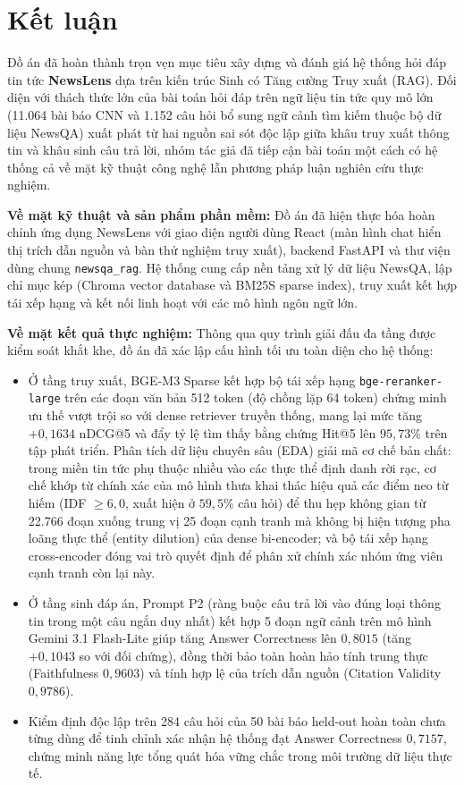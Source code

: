 \section{Kết luận}
\label{sec:conclusion}

Đồ án đã hoàn thành trọn vẹn mục tiêu xây dựng và đánh giá hệ thống hỏi đáp tin tức \textbf{NewsLens} dựa trên kiến trúc Sinh có Tăng cường Truy xuất (RAG). Đối diện với thách thức lớn của bài toán hỏi đáp trên ngữ liệu tin tức quy mô lớn (11.064 bài báo CNN và 1.152 câu hỏi bổ sung ngữ cảnh tìm kiếm thuộc bộ dữ liệu NewsQA) xuất phát từ hai nguồn sai sót độc lập giữa khâu truy xuất thông tin và khâu sinh câu trả lời, nhóm tác giả đã tiếp cận bài toán một cách có hệ thống cả về mặt kỹ thuật công nghệ lẫn phương pháp luận nghiên cứu thực nghiệm.

\textbf{Về mặt kỹ thuật và sản phẩm phần mềm:} Đồ án đã hiện thực hóa hoàn chỉnh ứng dụng NewsLens với giao diện người dùng React (màn hình chat hiển thị trích dẫn nguồn và bàn thử nghiệm truy xuất), backend FastAPI và thư viện dùng chung \texttt{newsqa\_rag}. Hệ thống cung cấp nền tảng xử lý dữ liệu NewsQA, lập chỉ mục kép (Chroma vector database và BM25S sparse index), truy xuất kết hợp tái xếp hạng và kết nối linh hoạt với các mô hình ngôn ngữ lớn.

\textbf{Về mặt kết quả thực nghiệm:} Thông qua quy trình giải đấu đa tầng được kiểm soát khắt khe, đồ án đã xác lập cấu hình tối ưu toàn diện cho hệ thống:
\begin{itemize}
  \item Ở tầng truy xuất, BGE-M3 Sparse kết hợp bộ tái xếp hạng \texttt{bge-reranker-large} trên các đoạn văn bản 512 token (độ chồng lặp 64 token) chứng minh ưu thế vượt trội so với dense retriever truyền thống, mang lại mức tăng $+0{,}1634$ nDCG@5 và đẩy tỷ lệ tìm thấy bằng chứng Hit@5 lên $95{,}73\%$ trên tập phát triển. Phân tích dữ liệu chuyên sâu (EDA) giải mã cơ chế bản chất: trong miền tin tức phụ thuộc nhiều vào các thực thể định danh rời rạc, cơ chế khớp từ chính xác của mô hình thưa khai thác hiệu quả các điểm neo từ hiếm (IDF $\ge 6{,}0$, xuất hiện ở $59{,}5\%$ câu hỏi) để thu hẹp không gian từ 22.766 đoạn xuống trung vị 25 đoạn cạnh tranh mà không bị hiện tượng pha loãng thực thể (entity dilution) của dense bi-encoder; và bộ tái xếp hạng cross-encoder đóng vai trò quyết định để phân xử chính xác nhóm ứng viên cạnh tranh còn lại này.
  \item Ở tầng sinh đáp án, Prompt P2 (ràng buộc câu trả lời vào đúng loại thông tin trong một câu ngắn duy nhất) kết hợp 5 đoạn ngữ cảnh trên mô hình Gemini 3.1 Flash-Lite giúp tăng Answer Correctness lên $0{,}8015$ (tăng $+0{,}1043$ so với đối chứng), đồng thời bảo toàn hoàn hảo tính trung thực (Faithfulness $0{,}9603$) và tính hợp lệ của trích dẫn nguồn (Citation Validity $0{,}9786$).
  \item Kiểm định độc lập trên 284 câu hỏi của 50 bài báo held-out hoàn toàn chưa từng dùng để tinh chỉnh xác nhận hệ thống đạt Answer Correctness $0{,}7157$, chứng minh năng lực tổng quát hóa vững chắc trong môi trường dữ liệu thực tế.
\end{itemize}


